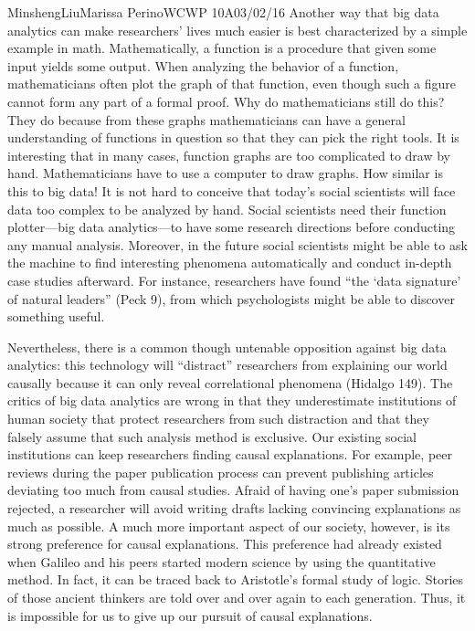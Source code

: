 \documentclass[12pt,letterpaper]{article}
\begin{document}
\begin{mla}{Minsheng}{Liu}{Marissa Perino}{WCWP 10A}{03/02/16}
Another way that big data analytics can make researchers' lives much
easier is best characterized by a simple example in math.
Mathematically, a function is a procedure that given some input yields
some output. When analyzing the behavior of a function, mathematicians
often plot the graph of that function, even though such a figure cannot
form any part of a formal proof. Why do mathematicians still do this?
They do because from these graphs mathematicians can have a general
understanding of functions in question so that they can pick the right
tools. It is interesting that in many cases, function graphs are too
complicated to draw by hand. Mathematicians have to use a computer to
draw graphs. How similar is this to big data! It is not hard to conceive
that today's social scientists will face data too complex to be analyzed
by hand. Social scientists need their function plotter---big data
analytics---to have some research directions before conducting any
manual analysis. Moreover, in the future social scientists might be able
to ask the machine to find interesting phenomena automatically and
conduct in-depth case studies afterward. For instance, researchers have
found ``the `data signature' of natural leaders'' (Peck 9), from which
psychologists might be able to discover something useful.

Nevertheless, there is a common though untenable opposition against big
data analytics: this technology will ``distract'' researchers from
explaining our world causally because it can only reveal correlational
phenomena (Hidalgo 149). The critics of big data analytics are wrong in
that they underestimate institutions of human society that protect
researchers from such distraction and that they falsely assume that such
analysis method is exclusive. Our existing social institutions can keep
researchers finding causal explanations. For example, peer reviews
during the paper publication process can prevent publishing articles
deviating too much from causal studies. Afraid of having one's paper
submission rejected, a researcher will avoid writing drafts lacking
convincing explanations as much as possible. A much more important
aspect of our society, however, is its strong preference for causal
explanations. This preference had already existed when Galileo and his
peers started modern science by using the quantitative method. In fact,
it can be traced back to Aristotle's formal study of logic. Stories of
those ancient thinkers are told over and over again to each generation.
Thus, it is impossible for us to give up our pursuit of causal
explanations.


\end{mla}
\end{document}
